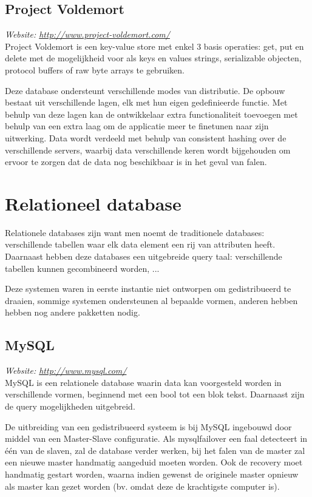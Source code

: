 \subsection{Project Voldemort}
\textit{Website: \url{http://www.project-voldemort.com/}}\\
Project Voldemort is een key-value store met enkel 3 basis operaties: get, put en delete met de mogelijkheid voor als keys en values strings, serializable objecten, protocol buffers of raw byte arrays te gebruiken. 

Deze database ondersteunt verschillende modes van distributie. De opbouw bestaat uit verschillende lagen, elk met hun eigen gedefinieerde functie. Met behulp van deze lagen kan de ontwikkelaar extra functionaliteit toevoegen met behulp van een extra laag om de applicatie meer te finetunen naar zijn uitwerking. 
Data wordt verdeeld met behulp van consistent hashing over de verschillende servers, waarbij data verschillende keren wordt bijgehouden om ervoor te zorgen dat de data nog beschikbaar is in het geval van falen. 

\section{Relationeel database}
Relationele databases zijn want men noemt de traditionele databases: verschillende tabellen waar elk data element een rij van attributen heeft. Daarnaast hebben deze databases een uitgebreide query taal: verschillende tabellen kunnen gecombineerd worden, ... 

Deze systemen waren in eerste instantie niet ontworpen om gedistribueerd te draaien, sommige systemen ondersteunen al bepaalde vormen, anderen hebben hebben nog andere pakketten nodig. 
\subsection{MySQL}
\textit{Website: \url{http://www.mysql.com/}}\\
MySQL is een relationele database waarin data kan voorgesteld worden in verschillende vormen, beginnend met een bool tot een blok tekst. Daarnaast zijn de query mogelijkheden uitgebreid. 

De uitbreiding van een gedistribueerd systeem is bij MySQL ingebouwd door middel van een Master-Slave configuratie. Als mysqlfailover een faal detecteert in één van de slaven, zal de database verder werken, bij het falen van de master zal een nieuwe master handmatig aangeduid moeten worden. Ook de recovery moet handmatig gestart worden, waarna indien gewenst de originele master opnieuw als master kan gezet worden (bv. omdat deze de krachtigste computer is). 

